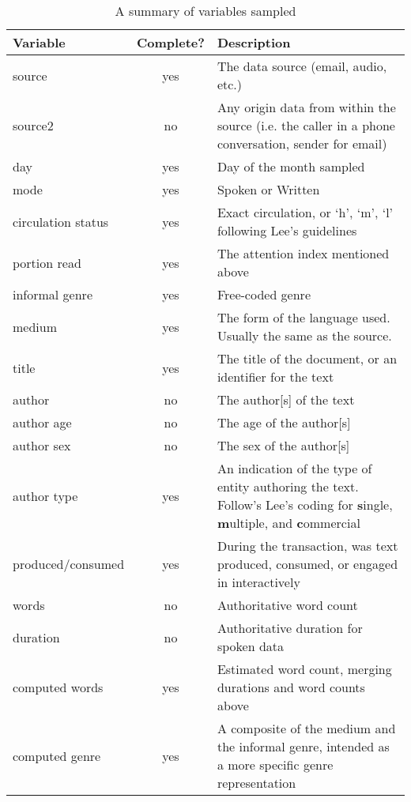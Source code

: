 \begin{table}[hp]
\centering
    \begin{tabular}{ | l | c | p{7cm} |}
    \hline
    \textbf{Variable} & \textbf{Complete?} & \textbf{Description} \\ \hline
   
    source              & yes & The data source (email, audio, etc.) \\ \hline
    source2             & no & Any origin data from within the source (i.e. the caller in a phone conversation, sender for email) \\ \hline
    day                 & yes & Day of the month sampled \\ \hline
    mode                & yes & Spoken or Written \\ \hline
    circulation status  & yes & Exact circulation, or `h', `m', `l' following Lee's guidelines\\ \hline
    portion read        & yes & The attention index mentioned above \\ \hline
    informal genre      & yes & Free-coded genre \\ \hline
    medium              & yes & The form of the language used.  Usually the same as the source. \\ \hline
    title               & yes & The title of the document, or an identifier for the text \\ \hline
    author              & no & The author[s] of the text\\ \hline
    author age          & no & The age of the author[s] \\ \hline
    author sex          & no & The sex of the author[s] \\ \hline
    author type         & yes & An indication of the type of entity authoring the text.  Follow's Lee's coding for \textbf{s}ingle, \textbf{m}ultiple, and \textbf{c}ommercial\\ \hline
    produced/consumed   & yes & During the transaction, was text produced, consumed, or engaged in interactively \\ \hline 
    words               & no & Authoritative word count\\ \hline
    duration            & no & Authoritative duration for spoken data\\ \hline
    computed words      & yes & Estimated word count, merging durations and word counts above\\ \hline
    computed genre      & yes & A composite of the medium and the informal genre, intended as a more specific genre representation \\
    \hline
    \end{tabular}
\caption{A summary of variables sampled}
\label{table:personal:variables}
\end{table}











